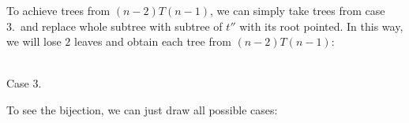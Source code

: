 \documentclass[final]{article}
\theoremstyle{definition}
\theoremstyle{remark}
\begin{document}
To achieve trees from \((n - 2) T(n - 1)\), we can simply take trees from case 3.\ and replace whole subtree with subtree of \(t''\) with its root pointed. In this way, we will lose \(2\) leaves and obtain each tree from \((n - 2) T(n - 1)\):

\begin{center}
    \begin{minipage}[t]{.3\textwidth}
        \begin{center}
            \\
            Case 3.
        \end{center}
    \end{minipage}%
\end{center}

To see the bijection, we can just draw all possible cases:
\end{document}
